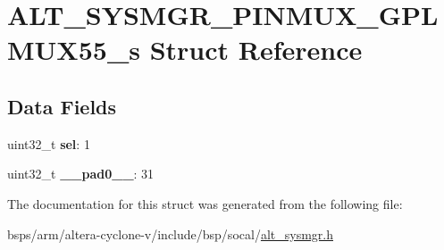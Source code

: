 \hypertarget{structALT__SYSMGR__PINMUX__GPLMUX55__s}{}\section{A\+L\+T\+\_\+\+S\+Y\+S\+M\+G\+R\+\_\+\+P\+I\+N\+M\+U\+X\+\_\+\+G\+P\+L\+M\+U\+X55\+\_\+s Struct Reference}
\label{structALT__SYSMGR__PINMUX__GPLMUX55__s}
\subsection*{Data Fields}
\begin{DoxyCompactItemize}
\item 
\mbox{\label{structALT__SYSMGR__PINMUX__GPLMUX55__s_abda1d7aef57daded3bb5df1165fd3dee}} 
uint32\+\_\+t {\bfseries sel}\+: 1
\item 
\mbox{\label{structALT__SYSMGR__PINMUX__GPLMUX55__s_ac3bf509d2947020d99826da30b509ab7}} 
uint32\+\_\+t {\bfseries \+\_\+\+\_\+pad0\+\_\+\+\_\+}\+: 31
\end{DoxyCompactItemize}


The documentation for this struct was generated from the following file\+:\begin{DoxyCompactItemize}
\item 
bsps/arm/altera-\/cyclone-\/v/include/bsp/socal/\mbox{\hyperlink{alt__sysmgr_8h}{alt\+\_\+sysmgr.\+h}}\end{DoxyCompactItemize}
